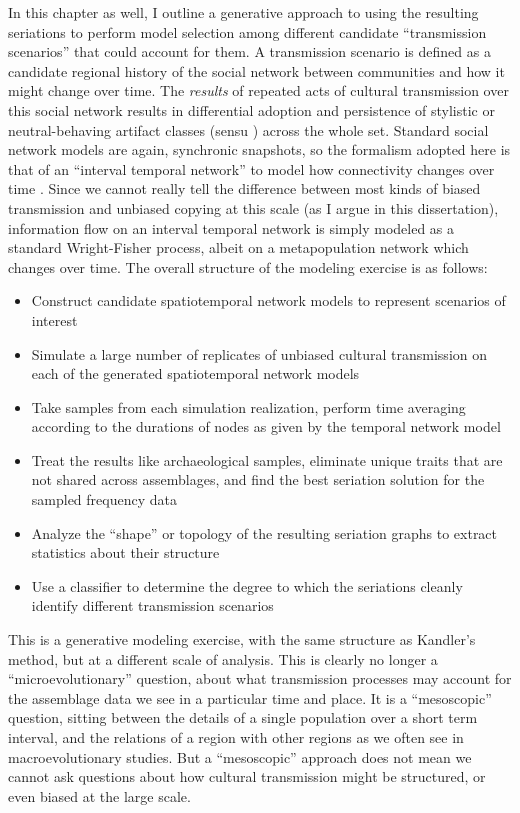 In this chapter as well, I outline a generative approach to using the resulting seriations to perform model selection among different candidate ``transmission scenarios'' that could account for them.  A transmission scenario is defined as a candidate regional history of the social network between communities and how it might change over time.  The \emph{results} of repeated acts of cultural transmission over this social network results in differential adoption and persistence of stylistic or neutral-behaving artifact classes (sensu \citealt{Dunnell1978}) across the whole set.  Standard social network models are again, synchronic snapshots, so the formalism adopted here is that of an ``interval temporal network'' to model how connectivity changes over time \citep{Holme2012}.  Since we cannot really tell the difference between most kinds of biased transmission and unbiased copying at this scale (as I argue in this dissertation), information flow on an interval temporal network is simply modeled as a standard Wright-Fisher process, albeit on a metapopulation network which changes over time.  The overall structure of the modeling exercise is as follows:

\begin{itemize}
    \item Construct candidate spatiotemporal network models to represent scenarios of interest
    \item Simulate a large number of replicates of unbiased cultural transmission on each of the generated spatiotemporal network models
    \item Take samples from each simulation realization, perform time averaging according to the durations of nodes as given by the temporal network model
    \item Treat the results like archaeological samples, eliminate unique traits that are not shared across assemblages, and find the best seriation solution for the sampled frequency data
    \item Analyze the ``shape'' or topology of the resulting seriation graphs to extract statistics about their structure
    \item Use a classifier to determine the degree to which the seriations cleanly identify different transmission scenarios
\end{itemize}

This is a generative modeling exercise, with the same structure as Kandler's \citeyearpar{Kandler20150905} method, but at a different scale of analysis.  This is clearly no longer a ``microevolutionary'' question, about what transmission processes may account for the assemblage data we see in a particular time and place.  It is a ``mesoscopic'' question, sitting between the details of a single population over a short term interval, and the relations of a region with other regions as we often see in macroevolutionary studies.  But a ``mesoscopic'' approach does not mean we cannot ask questions about how cultural transmission might be structured, or even biased at the large scale.  

